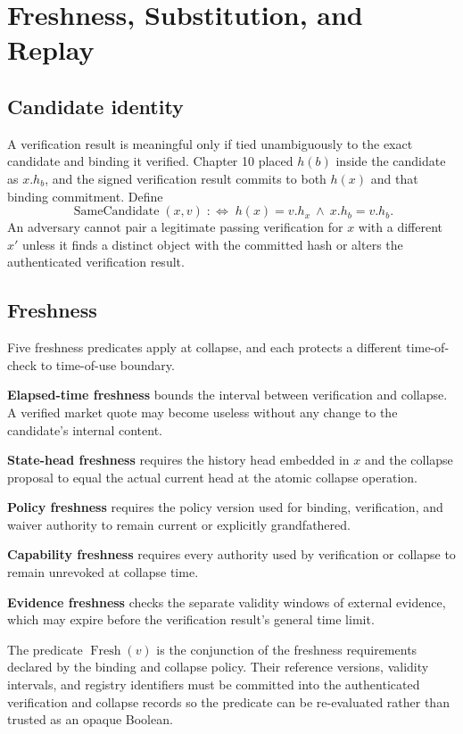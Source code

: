 \documentclass[11pt,openany]{book}
\begin{document}
\chapter{Freshness, Substitution, and Replay}
\section{Candidate identity}

A verification result is meaningful only if tied unambiguously to the exact
candidate and binding it verified. Chapter 10 placed \(h(b)\) inside the
candidate as \(x.h_b\), and the signed verification result commits to both
\(h(x)\) and that binding commitment. Define
\[
 \operatorname{SameCandidate}(x,v)
 \;:\!\iff\;
 h(x)=v.h_x\ \land\ x.h_b=v.h_b.
\]
An adversary cannot pair a legitimate passing verification for \(x\) with a
different \(x'\) unless it finds a distinct object with the committed hash or
alters the authenticated verification result.

\section{Freshness}

Five freshness predicates apply at collapse, and each protects a different
time-of-check to time-of-use boundary.

\textbf{Elapsed-time freshness} bounds the interval between verification and
collapse. A verified market quote may become useless without any change to the
candidate's internal content.

\textbf{State-head freshness} requires the history head embedded in \(x\) and
the collapse proposal to equal the actual current head at the atomic collapse
operation.

\textbf{Policy freshness} requires the policy version used for binding,
verification, and waiver authority to remain current or explicitly
grandfathered.

\textbf{Capability freshness} requires every authority used by verification
or collapse to remain unrevoked at collapse time.

\textbf{Evidence freshness} checks the separate validity windows of external
evidence, which may expire before the verification result's general time limit.

The predicate \(\operatorname{Fresh}(v)\) is the conjunction of the freshness
requirements declared by the binding and collapse policy. Their reference
versions, validity intervals, and registry identifiers must be committed into
the authenticated verification and collapse records so the predicate can be
re-evaluated rather than trusted as an opaque Boolean.
\end{document}

